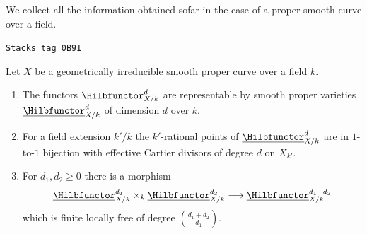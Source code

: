 We collect all the information obtained sofar in the case of
a proper smooth curve over a field.

\begin{proposition}[Hilb d]
\label{pic-proposition-hilb-d}
\href{https://stacks.math.columbia.edu/tag/0B9I}{\texttt{Stacks tag 0B9I}}

Let $X$ be a geometrically irreducible smooth proper curve over a field $k$.
\begin{enumerate}
\item The functors $\Hilbfunctor^d_{X/k}$ are representable by smooth
proper varieties $\underline{\Hilbfunctor}^d_{X/k}$ of dimension
$d$ over $k$.
\item For a field extension $k'/k$ the $k'$-rational points
of $\underline{\Hilbfunctor}^d_{X/k}$ are in $1$-to-$1$ bijection
with effective Cartier divisors of degree $d$ on $X_{k'}$.
\item For $d_1, d_2 \geq 0$ there is a morphism
$$
\underline{\Hilbfunctor}^{d_1}_{X/k}
\times_k
\underline{\Hilbfunctor}^{d_2}_{X/k}
\longrightarrow
\underline{\Hilbfunctor}^{d_1 + d_2}_{X/k}
$$
which is finite locally free of degree ${d_1 + d_2 \choose d_1}$.
\end{enumerate}
\end{proposition}

